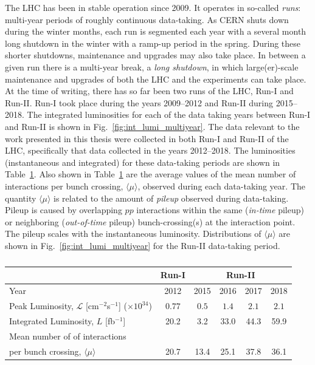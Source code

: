 The LHC has been in stable operation since 2009.
It operates in so-called \textit{runs}: multi-year periods of roughly continuous
data-taking.
As CERN shuts down during the winter months, each run is segmented each year
with a several month long shutdown in the winter with a ramp-up period in the spring.
During these shorter shutdowns, maintenance and upgrades may also take place.
In between a given run there is a multi-year break, a \textit{long shutdown},
in which large(er)-scale maintenance and upgrades of both the LHC and the experiments can take place.
At the time of writing, there has so far been two runs of the LHC, Run-I and Run-II.
Run-I took place during the years 2009--2012 and Run-II during 2015--2018.
The integrated luminosities for each of the data taking years between Run-I and Run-II
is shown in Fig.~\ref{fig:int_lumi_multiyear}.
The data relevant to the work presented in this thesis were collected in both
Run-I and Run-II of the LHC, specifically that data collected in the years 2012--2018.
The luminosities (instantaneous and integrated) for these data-taking periods are
shown in Table~\ref{tab:lumi_tab}.
Also shown in Table~\ref{tab:lumi_tab} are the average values of the mean number of interactions per bunch
crossing, $\langle \mu \rangle$, observed during each data-taking year. The quantity $\langle \mu \rangle$
is related to the amount of \textit{pileup} observed during data-taking. Pileup is caused
by overlapping $pp$ interactions within the same (\textit{in-time} pileup) or neighboring (\textit{out-of-time} pileup)
bunch-crossing(s) at the interaction point. The pileup scales with the instantaneous luminosity.
Distributions of $\langle \mu \rangle$ are shown in Fig.~\ref{fig:int_lumi_multiyear} for
the Run-II data-taking period.


\begin{table}[!htb]
    \begin{center}
        \begin{tabular}{l | c | c c c c }
        \hline
        \hline
        & \textbf{Run-I} & \multicolumn{4}{c}{\textbf{Run-II}} \\
        \hline
        Year & 2012 & 2015 & 2016 & 2017 & 2018 \\
        \hline
        Peak Luminosity, $\mathcal{L}$ [cm$^{-2}$s$^{-1}$] ($\times10^{34}$) & $0.77$ & $0.5$ & $1.4$ & $2.1$ & $2.1$ \\ 
        Integrated Luminosity, $L$ [fb$^{-1}$] & 20.2 & 3.2 & 33.0 & 44.3 & 59.9 \\
        Mean number of of interactions & & & & & \\
        \hspace{1.7cm} per bunch crossing, $\langle \mu \rangle$ & 20.7 & 13.4 & 25.1 & 37.8 & 36.1 \\
        \hline
        \hline
        \end{tabular}
        \caption{
        }
        \label{tab:lumi_tab}
    \end{center}
\end{table}

